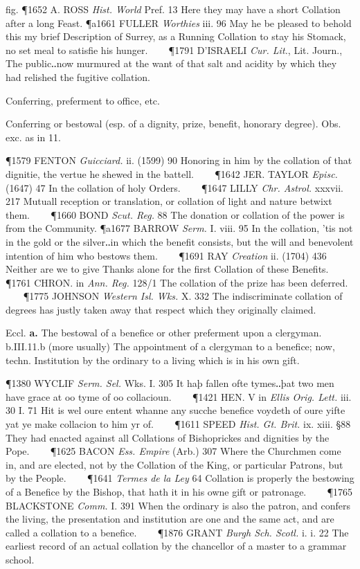 \begin{description}[wide, labelwidth=!, labelindent=0pt]
\begin{myenumerate}
fig. \P 1652 A. ROSS  \textit{Hist. World} Pref. 13 Here they may have a short Collation after a long Feast.
\P a1661 FULLER  \textit{Worthies} iii. 96 May he be pleased to behold this my brief Description of Surrey, as a Running Collation to stay his Stomack, no set meal to satisfie his hunger.    
\P 1791 D'ISRAELI  \textit{Cur. Lit.}, Lit. Journ., The public‥now murmured at the want of that salt and acidity by which they had relished the fugitive collation.

 Conferring, preferment to office, etc.

 Conferring or bestowal (esp. of a dignity, prize, benefit, honorary degree). Obs. exc. as in 11.

\P 1579 FENTON  \textit{Guicciard.} ii. (1599) 90 Honoring in him by the collation of that dignitie, the vertue he shewed in the battell.    
\P 1642 JER. TAYLOR  \textit{Episc.} (1647) 47 In the collation of holy Orders.    
\P 1647 LILLY  \textit{Chr. Astrol.} xxxvii. 217 Mutuall reception or translation, or collation of light and nature betwixt them.    
\P 1660 BOND  \textit{Scut. Reg.} 88 The donation or collation of the power is from the Community.
\P a1677 BARROW  \textit{Serm.} I. viii. 95 In the collation, 'tis not in the gold or the silver‥in which the benefit consists, but the will and benevolent intention of him who bestows them.    
\P 1691 RAY  \textit{Creation} ii. (1704) 436 Neither are we to give Thanks alone for the first Collation of these Benefits.    
\P 1761 CHRON. in  \textit{Ann. Reg.} 128/1 The collation of the prize has been deferred.    
\P 1775 JOHNSON  \textit{Western Isl. Wks.} X. 332 The indiscriminate collation of degrees has justly taken away that respect which they originally claimed.

 Eccl. \textbf{a.} The bestowal of a benefice or other preferment upon a clergyman. b.III.11.b (more usually) The appointment of a clergyman to a benefice; now, techn. Institution by the ordinary to a living which is in his own gift.

\P 1380 WYCLIF  \textit{Serm. Sel.} Wks. I. 305 It haþ fallen ofte tymes‥þat two men have grace at oo tyme of oo collacioun.    
\P 1421 HEN. V in \textit{Ellis Orig. Lett.} iii. 30 I. 71 Hit is wel oure entent whanne any sucche benefice voydeth of oure yifte yat ye make collacion to him yr of.    
\P 1611 SPEED  \textit{Hist. Gt. Brit.} ix. xiii. §88 They had enacted against all Collations of Bishoprickes and dignities by the Pope.    
\P 1625 BACON  \textit{Ess. Empire} (Arb.) 307 Where the Churchmen come in, and are elected, not by the Collation of the King, or particular Patrons, but by the People.    
\P 1641 \textit{Termes  de la Ley} 64 Collation is properly the bestowing of a Benefice by the Bishop, that hath it in his owne gift or patronage.    
\P 1765 BLACKSTONE  \textit{Comm.} I. 391 When the ordinary is also the patron, and confers the living, the presentation and institution are one and the same act, and are called a collation to a benefice.    
\P 1876 GRANT  \textit{Burgh Sch. Scotl.} i. i. 22 The earliest record of an actual collation by the chancellor of a master to a grammar school.


\end{myenumerate}
\end{description}
